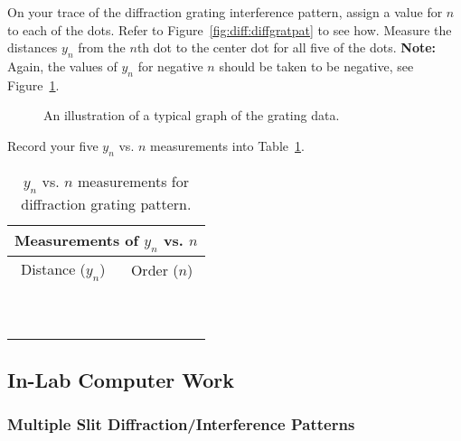 \noindent 
On your trace of the diffraction grating interference pattern, assign
a value for $n$ to each of the dots. Refer to Figure~\ref{fig:diff:diffgratpat}
to see how.  Measure the distances $y_n$ from the $n$th dot to the center 
dot for
all five of the dots. {\bf Note:} Again, the values of $y_n$ for
negative $n$ should be taken to be negative, see 
Figure~\ref{fig:diff:gratgraph}. 


\begin{figure}[htb]
\centerline{\epsfxsize=7cm }
\caption{An illustration of a typical graph of the grating data.}
\label{fig:diff:gratgraph}
\end{figure}
\vspace*{1cm} 
\noindent 
Record your five $y_n$
vs. $n$ measurements into Table~\ref{tab:DI:Grating}.
\begin{table}[htb]
\begin{center}
\begin{tabular}{|c|c|}
\hline
\multicolumn{2}{|c|}{Measurements of $y_n$ vs. $n$} \\
\hline
Distance ($y_n$) & Order ($n$) \\
\hline
\hspace*{3cm} & \hspace*{3cm}  \\
& \\
\hline
& \\ & \\
\hline
& \\ & \\
\hline
& \\ & \\
\hline
& \\ & \\
\hline
\end{tabular}
\end{center}
\caption{$y_n$ vs. $n$ measurements for diffraction grating pattern.}
\label {tab:DI:Grating}
\end{table}
 
\clearpage

\subsection{In-Lab Computer Work}


\subsubsection{Multiple Slit Diffraction/Interference Patterns}

